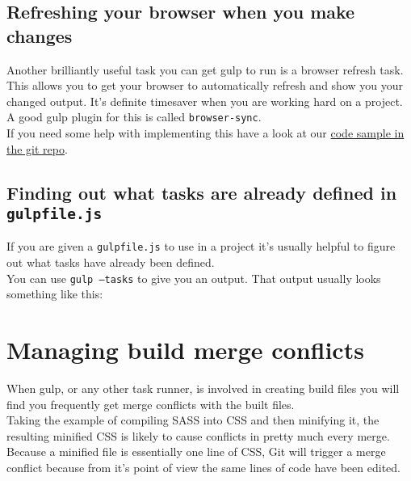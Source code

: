 \subsection{Refreshing your browser when you make changes}

Another brilliantly useful task you can get gulp to run is a browser refresh task.
\\

This allows you to get your browser to automatically refresh and show you your changed output. It's definite timesaver when you are working hard on a project.
\\ 

A good gulp plugin for this is called \texttt{browser-sync}.
\\

If you need some help with implementing this have a look at our \href{https://gist.github.com/oliward/426a6a89bda3d55c614b495431290ba4}{code sample in the git repo}.
\\


\subsection{Finding out what tasks are already defined in \texttt{gulpfile.js}}

If you are given a \texttt{gulpfile.js} to use in a project it's usually helpful to figure out what tasks have already been defined.
\\

You can use \texttt{gulp --tasks} to give you an output. That output usually looks something like this:
\\






\section{Managing build merge conflicts}

When gulp, or any other task runner, is involved in creating build files you will find you frequently get merge conflicts with the built files.
\\

Taking the example of compiling SASS into CSS and then minifying it, the resulting minified CSS is likely to cause conflicts in pretty much every merge. Because a minified file is essentially one line of CSS, Git will trigger a merge conflict because from it's point of view the same lines of code have been edited.
\\

